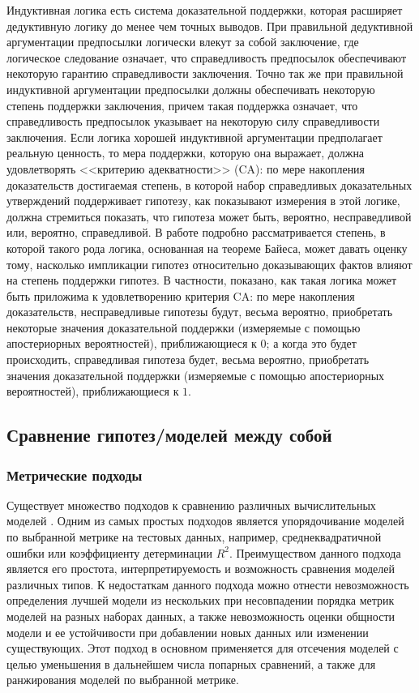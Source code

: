 Индуктивная логика есть система доказательной поддержки, которая расширяет дедуктивную логику до менее чем точных 
выводов. При правильной дедуктивной аргументации предпосылки логически влекут за собой заключение, где логическое 
следование означает, что справедливость предпосылок обеспечивают некоторую гарантию справедливости заключения. Точно 
так же при правильной индуктивной аргументации предпосылки должны обеспечивать некоторую степень поддержки заключения, 
причем такая поддержка означает, что справедливость предпосылок указывает на некоторую силу справедливости заключения. 
Если логика хорошей индуктивной аргументации предполагает реальную ценность, то мера поддержки, которую она выражает, 
должна удовлетворять <<критерию адекватности>> (CA): по мере накопления доказательств достигаемая степень, в которой 
набор справедливых доказательных утверждений поддерживает гипотезу, как показывают измерения в этой логике, должна 
стремиться показать, что гипотеза может быть, вероятно, несправедливой или, вероятно, справедливой. В работе 
\cite{hawthorne2021} подробно рассматривается степень, в которой такого рода логика, основанная на теореме Байеса, 
может давать оценку тому, насколько импликации гипотез относительно доказывающих фактов влияют на степень поддержки 
гипотез. В частности, показано, как такая логика может быть приложима к удовлетворению критерия CA: по мере 
накопления доказательств, несправедливые гипотезы будут, весьма вероятно, приобретать некоторые значения доказательной 
поддержки (измеряемые с помощью апостериорных вероятностей), приближающиеся к $0$; а когда это будет происходить, 
справедливая гипотеза будет, весьма вероятно, приобретать значения доказательной поддержки (измеряемые с помощью 
апостериорных вероятностей), приближающиеся к $1$.


\subsection{Сравнение гипотез/моделей между собой} \label{sect1_2_3}

\subsubsection{Метрические подходы}\label{sect1_2_3_1}
Существует множество подходов к сравнению различных вычислительных моделей \cite{tirikov2021methods}. Одним из самых 
простых подходов \cite{pham2019new, pham2007system} является упорядочивание моделей по выбранной метрике на тестовых 
данных, например, среднеквадратичной ошибки или коэффициенту детерминации $R^2$. Преимуществом данного подхода 
является его простота, интерпретируемость и возможность сравнения моделей различных типов. К недостаткам данного
 подхода можно отнести невозможность определения лучшей модели из нескольких при несовпадении порядка метрик моделей 
 на разных наборах данных, а также невозможность оценки общности модели и ее устойчивости при добавлении новых данных 
 или изменении существующих. Этот подход в основном применяется для отсечения моделей с целью уменьшения в дальнейшем 
 числа попарных сравнений, а также для ранжирования моделей по выбранной метрике.

